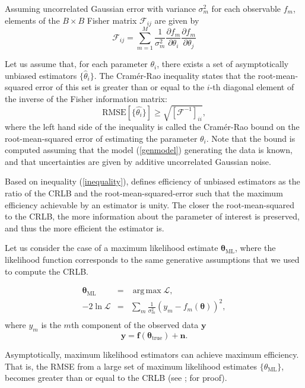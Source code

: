 \documentclass[12pt, preprint]{aastex}
\DeclareMathOperator*{\argmax}{arg\,max}
\newcommand{\beq}{\begin{equation}}
\newcommand{\eeq}{\end{equation}}
\begin{document}
Assuming uncorrelated Gaussian error with variance $\sigma^{2}_{m}$ for each observable $f_{m}$, elements
of the $B\times B$ Fisher matrix $\mathcal{F}_{ij}$ are given by
\beq
\mathcal{F}_{ij} = \sum_{m=1}^{M}\frac{1}{\sigma_{m}^{2}}\frac{\partial f_{m}}{\partial \theta_{i}}\frac{\partial f_{m}}{\partial \theta_{j}}
\label{fisher}
\eeq

Let us assume that, for each parameter $\theta_{i}$, there exists a set of 
asymptotically unbiased estimators $\{\hat{\theta}_{i}\}$. The Cram\'{e}r-Rao inequality 
states that the root-mean-squared error of this set is greater than or equal to 
the $i$-th diagonal element of the inverse of the Fisher information matrix:
\beq
\text{RMSE}[\{\hat{\theta_{i}}\}] \geq \sqrt{[\mathcal{F}^{-1}]_{ii}},
\label{inequality}
\eeq
where the left hand side of the inequality is called the Cram\'{e}r-Rao bound on 
the root-mean-squared error of estimating the parameter $\theta_{i}$. Note that 
the bound is computed assuming that the model (\ref{genmodel}) generating the data 
is known, and that uncertainties are given by additive uncorrelated Gaussian noise.

Based on inequality (\ref{inequality}), \citet{cramer} defines efficiency of unbiased 
estimators as the ratio of the CRLB and the root-mean-squared-error such that the maximum efficiency 
achievable by an estimator is unity. The closer the root-mean-squared 
to the CRLB, the more information about the parameter of interest is preserved, and thus the more efficient 
the estimator is. 

Let us consider the case of a maximum likelihood estimate $\boldsymbol{\mathbf{\theta}}_{\text{ML}}$, where the likelihood function corresponds to the same generative assumptions that we used to compute the CRLB.

\begin{eqnarray}
\boldsymbol{\mathbf{\theta}}_{\text{ML}} &=& \argmax \mathcal{L}, \\
-2\ln \mathcal{L} &=& \sum_{m}\frac{1}{\sigma_{m}^{2}}( y_{m} - f_{m}(\boldsymbol{\mathbf{\theta}}))^{2}, \\
\end{eqnarray}
where $y_{m}$ is the $m$th component of the observed data $\mathbf{y}$
\beq
\mathbf{y} = \mathbf{f}(\boldsymbol{\mathbf{\theta}}_{\text{true}}) + \mathbf{n}.
\eeq

Asymptotically, maximum likelihood estimators can achieve maximum efficiency. That is, the RMSE from a 
large set of maximum likelihood estimates $\{\theta_{\text{ML}}\}$, 
becomes greater than or equal to the CRLB (see \citealt{cramer}; \citealt{lecam} for proof). 
\end{document}
